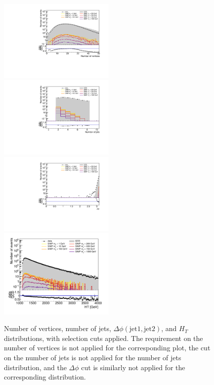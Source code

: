 \begin{figure}[ht]
  \centering
  \includegraphics[width=0.5\textwidth]{figures/nvtx_newtrigger}\hfill%
  \includegraphics[width=0.5\textwidth]{figures/njets_newtrigger}
  \includegraphics[width=0.5\textwidth]{figures/deltaphi}\hfill
  \includegraphics[width=0.5\textwidth]{figures/HT_newtrigger}
  \caption{Number of vertices, number of jets, $\Delta\phi (\mathrm{jet}1, \mathrm{jet}2)$, and $H_{T}$ distributions, with selection cuts applied. The requirement on the number of vertices is not applied for the corresponding plot, the cut on the number of jets is not applied for the number of jets distribution, and the $\Delta\phi$ cut is similarly not applied for the corresponding distribution.}
  \label{fig:event_selection_2}
\end{figure}

